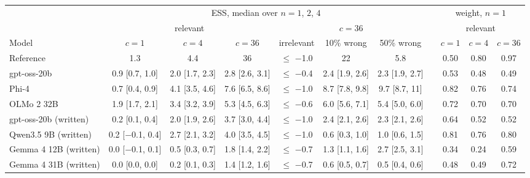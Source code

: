 \begin{tabular}{lcccccccccc}
\toprule
& \multicolumn{6}{c}{ESS, median over $n = 1$, $2$, $4$} & & \multicolumn{3}{c}{weight, $n = 1$} \\
\cmidrule(lr){2-7} \cmidrule(lr){9-11}
& \multicolumn{3}{c}{relevant} & \multicolumn{3}{c}{$c = 36$} & & \multicolumn{3}{c}{relevant} \\
\cmidrule(lr){2-4} \cmidrule(lr){5-7} \cmidrule(lr){9-11}
Model & $c = 1$ & $c = 4$ & $c = 36$ & irrelevant & 10\% wrong & 50\% wrong & & $c = 1$ & $c = 4$ & $c = 36$ \\
\midrule
Reference & 1.3 & 4.4 & 36 & $\leq$ $-$1.0 & 22 & 5.8 & & 0.50 & 0.80 & 0.97 \\
\midrule
gpt-oss-20b & 0.9 {\scriptsize[0.7, 1.0]} & 2.0 {\scriptsize[1.7, 2.3]} & 2.8 {\scriptsize[2.6, 3.1]} & $\leq$ $-$0.4 & 2.4 {\scriptsize[1.9, 2.6]} & 2.3 {\scriptsize[1.9, 2.7]} & & 0.53 & 0.48 & 0.49 \\
Phi-4 & 0.7 {\scriptsize[0.4, 0.9]} & 4.1 {\scriptsize[3.5, 4.6]} & 7.6 {\scriptsize[6.5, 8.6]} & $\leq$ $-$1.0 & 8.7 {\scriptsize[7.8, 9.8]} & 9.7 {\scriptsize[8.7, 11]} & & 0.82 & 0.76 & 0.74 \\
OLMo 2 32B & 1.9 {\scriptsize[1.7, 2.1]} & 3.4 {\scriptsize[3.2, 3.9]} & 5.3 {\scriptsize[4.5, 6.3]} & $\leq$ $-$0.6 & 6.0 {\scriptsize[5.6, 7.1]} & 5.4 {\scriptsize[5.0, 6.0]} & & 0.72 & 0.70 & 0.70 \\
gpt-oss-20b (written) & 0.2 {\scriptsize[0.1, 0.4]} & 2.0 {\scriptsize[1.9, 2.6]} & 3.7 {\scriptsize[3.0, 4.4]} & $\leq$ $-$1.0 & 2.4 {\scriptsize[2.1, 2.6]} & 2.3 {\scriptsize[2.1, 2.6]} & & 0.64 & 0.52 & 0.52 \\
Qwen3.5 9B (written) & 0.2 {\scriptsize[$-$0.1, 0.4]} & 2.7 {\scriptsize[2.1, 3.2]} & 4.0 {\scriptsize[3.5, 4.5]} & $\leq$ $-$1.0 & 0.6 {\scriptsize[0.3, 1.0]} & 1.0 {\scriptsize[0.6, 1.5]} & & 0.81 & 0.76 & 0.80 \\
Gemma 4 12B (written) & 0.0 {\scriptsize[$-$0.1, 0.1]} & 0.5 {\scriptsize[0.3, 0.7]} & 1.8 {\scriptsize[1.4, 2.2]} & $\leq$ $-$0.7 & 1.3 {\scriptsize[1.1, 1.6]} & 2.7 {\scriptsize[2.5, 3.1]} & & 0.34 & 0.24 & 0.59 \\
Gemma 4 31B (written) & 0.0 {\scriptsize[0.0, 0.0]} & 0.2 {\scriptsize[0.1, 0.3]} & 1.4 {\scriptsize[1.2, 1.6]} & $\leq$ $-$0.7 & 0.6 {\scriptsize[0.5, 0.7]} & 0.5 {\scriptsize[0.4, 0.6]} & & 0.48 & 0.49 & 0.72 \\
\bottomrule
\end{tabular}
